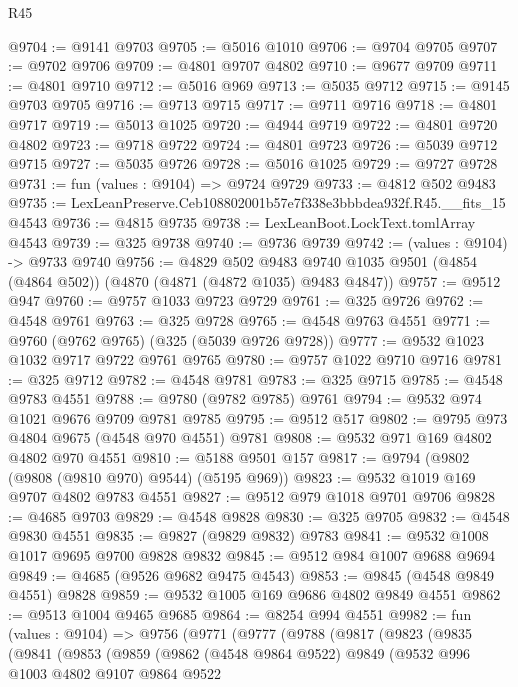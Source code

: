 \begin{lexlean}{R45}
\begin{coremodule}
@9704 := @9141 @9703
@9705 := @5016 @1010
@9706 := @9704 @9705
@9707 := @9702 @9706
@9709 := @4801 @9707 @4802
@9710 := @9677 @9709
@9711 := @4801 @9710
@9712 := @5016 @969
@9713 := @5035 @9712
@9715 := @9145 @9703 @9705
@9716 := @9713 @9715
@9717 := @9711 @9716
@9718 := @4801 @9717
@9719 := @5013 @1025
@9720 := @4944 @9719
@9722 := @4801 @9720 @4802
@9723 := @9718 @9722
@9724 := @4801 @9723
@9726 := @5039 @9712 @9715
@9727 := @5035 @9726
@9728 := @5016 @1025
@9729 := @9727 @9728
@9731 := fun (values : @9104) => @9724 @9729
@9733 := @4812 @502 @9483
@9735 := LexLeanPreserve.Ceb108802001b57e7f338e3bbbdea932f.R45.__fits_15 @4543
@9736 := @4815 @9735
@9738 := LexLeanBoot.LockText.tomlArray @4543
@9739 := @325 @9738
@9740 := @9736 @9739
@9742 := (values : @9104) -> @9733 @9740
@9756 := @4829
    @502
    @9483
    @9740
    @1035
    @9501
    (@4854 (@4864 @502))
    (@4870 (@4871 (@4872 @1035) @9483 @4847))
@9757 := @9512 @947
@9760 := @9757 @1033 @9723 @9729
@9761 := @325 @9726
@9762 := @4548 @9761
@9763 := @325 @9728
@9765 := @4548 @9763 @4551
@9771 := @9760 (@9762 @9765) (@325 (@5039 @9726 @9728))
@9777 := @9532 @1023 @1032 @9717 @9722 @9761 @9765
@9780 := @9757 @1022 @9710 @9716
@9781 := @325 @9712
@9782 := @4548 @9781
@9783 := @325 @9715
@9785 := @4548 @9783 @4551
@9788 := @9780 (@9782 @9785) @9761
@9794 := @9532 @974 @1021 @9676 @9709 @9781 @9785
@9795 := @9512 @517
@9802 := @9795 @973 @4804 @9675 (@4548 @970 @4551) @9781
@9808 := @9532 @971 @169 @4802 @4802 @970 @4551
@9810 := @5188 @9501 @157
@9817 := @9794 (@9802 (@9808 (@9810 @970) @9544) (@5195 @969))
@9823 := @9532 @1019 @169 @9707 @4802 @9783 @4551
@9827 := @9512 @979 @1018 @9701 @9706
@9828 := @4685 @9703
@9829 := @4548 @9828
@9830 := @325 @9705
@9832 := @4548 @9830 @4551
@9835 := @9827 (@9829 @9832) @9783
@9841 := @9532 @1008 @1017 @9695 @9700 @9828 @9832
@9845 := @9512 @984 @1007 @9688 @9694
@9849 := @4685 (@9526 @9682 @9475 @4543)
@9853 := @9845 (@4548 @9849 @4551) @9828
@9859 := @9532 @1005 @169 @9686 @4802 @9849 @4551
@9862 := @9513 @1004 @9465 @9685
@9864 := @8254 @994 @4551
@9982 := fun (values : @9104) =>
  @9756
    (@9771
      (@9777
        (@9788
          (@9817
            (@9823
              (@9835
                (@9841
                  (@9853
                    (@9859
                      (@9862
                        (@4548 @9864 @9522)
                        @9849
                        (@9532
                          @996
                          @1003
                          @4802
                          @9107
                          @9864
                          @9522

\end{coremodule}
\end{lexlean}
